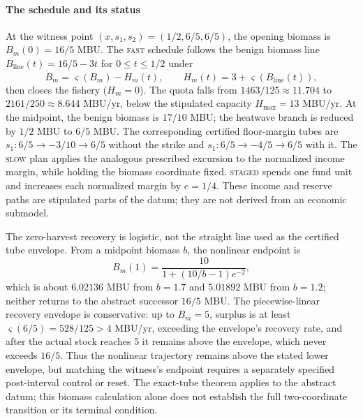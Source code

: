 \documentclass[preprint,11pt,authoryear]{elsarticle}
\theoremstyle{definition}
\theoremstyle{remark}
\newcommand{\act}[1]{\textsc{#1}}
\begin{document}
\paragraph{The schedule and its status} At the witness point $(x,s_1,s_2)=(1/2,6/5,6/5)$, the opening biomass is $B_m(0)=16/5$ MBU. The \act{fast} schedule follows the benign biomass line $B_{\mathrm{line}}(t)=16/5-3t$ for $0\le t\le1/2$ under
\[
\dot B_m=\varsigma(B_m)-H_m(t),\qquad H_m(t)=3+\varsigma(B_{\mathrm{line}}(t)),
\]
then closes the fishery ($H_m=0$). The quota falls from $1463/125\approx11.704$ to $2161/250\approx8.644$ MBU/yr, below the stipulated capacity $H_{\max}=13$ MBU/yr. At the midpoint, the benign biomass is $17/10$ MBU; the heatwave branch is reduced by $1/2$ MBU to $6/5$ MBU. The corresponding certified floor-margin tubes are $s_1:6/5\to-3/10\to6/5$ without the strike and $s_1:6/5\to-4/5\to6/5$ with it. The \act{slow} plan applies the analogous prescribed excursion to the normalized income margin, while holding the biomass coordinate fixed. \act{staged} spends one fund unit and increases each normalized margin by $e=1/4$. These income and reserve paths are stipulated parts of the datum; they are not derived from an economic submodel.

The zero-harvest recovery is logistic, not the straight line used as the certified tube envelope. From a midpoint biomass $b$, the nonlinear endpoint is
\[
B_m(1)=\frac{10}{1+(10/b-1)e^{-2}},
\]
which is about $6.02136$ MBU from $b=1.7$ and $5.01892$ MBU from $b=1.2$; neither returns to the abstract successor $16/5$ MBU. The piecewise-linear recovery envelope is conservative: up to $B_m=5$, surplus is at least $\varsigma(6/5)=528/125>4$ MBU/yr, exceeding the envelope's recovery rate, and after the actual stock reaches $5$ it remains above the envelope, which never exceeds $16/5$. Thus the nonlinear trajectory remains above the stated lower envelope, but matching the witness's endpoint requires a separately specified post-interval control or reset. The exact-tube theorem applies to the abstract datum; this biomass calculation alone does not establish the full two-coordinate transition or its terminal condition.
\end{document}

